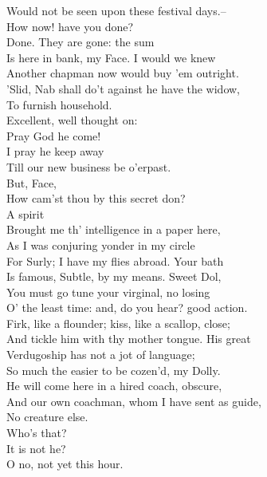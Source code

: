 \documentclass{memoir}
\begin{document}
\begin{drama*}
 Would not be seen upon these festival days.--\\
 How now! have you done?\\
\subtlespeaks {} Done. They are gone: the sum\\
 Is here in bank, my Face. I would we knew\\
 Another chapman now would buy 'em outright.\\
\facespeaks  'Slid, Nab shall do't against he have the widow,\\
 To furnish household.\\
\subtlespeaks {} Excellent, well thought on:\\
 Pray God he come!\\
\facespeaks {} I pray he keep away\\
 Till our new business be o'erpast.\\
\subtlespeaks  But, Face,\\
 How cam'st thou by this secret don?\\
\facespeaks {} A spirit\\
 Brought me th' intelligence in a paper here,\\
 As I was conjuring yonder in my circle\\
 For Surly; I have my flies abroad. Your bath\\
 Is famous, Subtle, by my means. Sweet Dol,\\
 You must go tune your virginal, no losing\\
 O' the least time: and, do you hear? good action.\\
 Firk, like a flounder; kiss, like a scallop, close;\\
 And tickle him with thy mother tongue. His great\\
 Verdugoship has not a jot of language;\\
 So much the easier to be cozen'd, my Dolly.\\
 He will come here in a hired coach, obscure,\\
 And our own coachman, whom I have sent as guide,\\
 No creature else.\\
 Who's that?\\
\subtlespeaks {} It is not he?\\
\facespeaks {} O no, not yet this hour.\\

\end{drama*}
\end{document}
